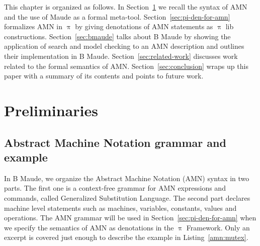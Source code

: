 \documentclass[a4paper,openany]{book}
\begin{document}
This chapter is organized as follows. In Section~\ref{sec:b-preliminaries} we recall the syntax of AMN and the use of Maude as a formal meta-tool. Section~\ref{sec:pi-den-for-amn} formalizes AMN in $\uppi$ by giving denotations of AMN statements as $\uppi$ lib constructions. Section~\ref{sec:bmaude} talks about B Maude by showing the application of search and model checking to an AMN description and outlines their implementation in B Maude. Section~\ref{sec:related-work} discusses work related to the formal semantics of AMN. Section~\ref{sec:conclusion} wraps up this paper with a summary of its contents and points to future work.

\section{Preliminaries}\label{sec:b-preliminaries}
%

\subsection{Abstract Machine Notation grammar and example}\label{sec:amn-cfg-and-ex}

In B Maude, we organize the Abstract Machine Notation (AMN) syntax in two parts. The first one is a context-free grammar for AMN expressions and commands, called Generalized Substitution Language. The second part declares machine level statements such as machines, variables, constants, values and operations. The AMN grammar will be used in Section~\ref{sec:pi-den-for-amn} when we specify the semantics of AMN as denotations in the $\uppi$ Framework. 
Only an excerpt is covered just enough to describe the example in Listing~\ref{amn:mutex}.

\end{document}
